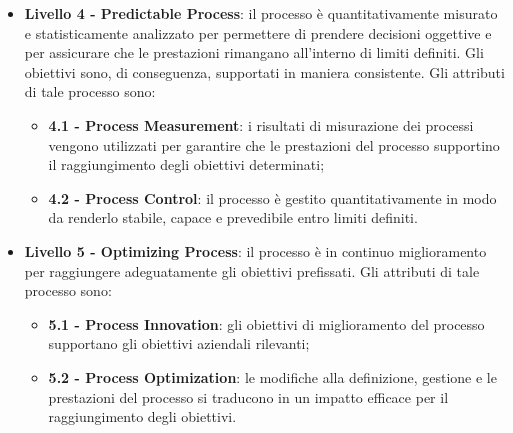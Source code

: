 \begin{itemize}
\begin{itemize}
	\end{itemize}
	\item \textbf {Livello 4 - Predictable Process}: il processo è quantitativamente misurato e statisticamente analizzato per permettere di prendere decisioni oggettive e per assicurare che le prestazioni rimangano all'interno di limiti definiti. Gli obiettivi sono, di conseguenza, supportati in maniera consistente. Gli attributi di tale processo sono:
	\begin{itemize}
		\item \textbf{4.1 - Process Measurement}: i risultati di misurazione dei processi vengono utilizzati per garantire che le prestazioni del processo supportino il raggiungimento degli obiettivi determinati;
		\item \textbf{4.2 - Process Control}: il processo è gestito quantitativamente in modo da renderlo stabile, capace e prevedibile entro limiti definiti.
	\end{itemize}
	\item \textbf {Livello 5 - Optimizing Process}: il processo è in continuo miglioramento per raggiungere adeguatamente gli obiettivi prefissati. Gli attributi di tale processo sono:
	\begin{itemize}
		\item \textbf{5.1 - Process Innovation}: gli obiettivi di miglioramento del processo supportano gli obiettivi aziendali rilevanti;
		\item \textbf{5.2 - Process Optimization}: le modifiche alla definizione, gestione e le prestazioni del processo si traducono in un impatto efficace per il raggiungimento degli obiettivi.
	\end{itemize}
\end{itemize}

